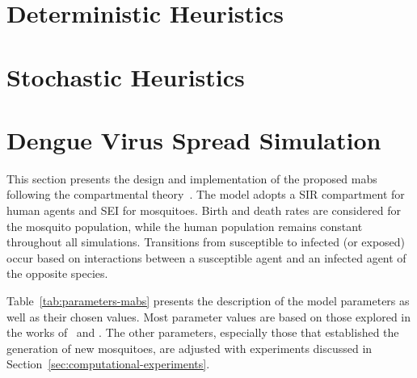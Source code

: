 \section{Deterministic Heuristics}\label{sec:deterministic-heuristics}

\section{Stochastic Heuristics}\label{sec:stochastic-heuristics}
\section{Dengue Virus Spread Simulation}\label{sec:dengue-virus-spread-simulation}

This section presents the design and implementation of the proposed \gls{mabs}
following the compartmental theory~\citep{amaku:2014}. The model adopts a SIR
compartment for human agents and SEI for mosquitoes. Birth and death rates are
considered for the mosquito population, while the human population remains
constant throughout all simulations. Transitions from susceptible to infected
(or exposed) occur based on interactions between a susceptible agent and an
infected agent of the opposite species.

Table~\ref{tab:parameters-mabs} presents the description of the model parameters
as well as their chosen values. Most parameter values are based on those
explored in the works of~\cite{da-silva:2020} and \cite{dwivedi:2022}. The other
parameters, especially those that established the generation of new mosquitoes,
are adjusted with experiments discussed in
Section~\ref{sec:computational-experiments}.

